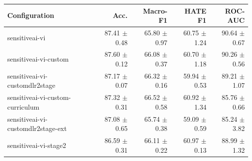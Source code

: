 \scriptsize
\setlength{\tabcolsep}{2pt}
\begin{tabular}{lrrrr}
\toprule
Configuration & Acc. & Macro-F1 & HATE F1 & ROC-AUC \\
\midrule
sensitiveai-vi & 87.41 $\pm$ 0.48 & 65.80 $\pm$ 0.97 & 60.75 $\pm$ 1.24 & 90.64 $\pm$ 0.67 \\
sensitiveai-vi-custom & 87.60 $\pm$ 0.12 & 66.08 $\pm$ 0.37 & 60.70 $\pm$ 1.18 & 90.26 $\pm$ 0.56 \\
sensitiveai-vi-customdlr2stage & 87.17 $\pm$ 0.07 & 66.32 $\pm$ 0.16 & 59.94 $\pm$ 0.53 & 89.21 $\pm$ 1.07 \\
sensitiveai-vi-custom-curriculum & 87.32 $\pm$ 0.31 & 66.52 $\pm$ 0.58 & 60.92 $\pm$ 1.34 & 85.76 $\pm$ 0.66 \\
sensitiveai-vi-customdlr2stage-ext & 87.08 $\pm$ 0.65 & 65.74 $\pm$ 0.38 & 59.09 $\pm$ 0.59 & 85.24 $\pm$ 3.82 \\
sensitiveai-vi-stage2 & 86.59 $\pm$ 0.31 & 66.11 $\pm$ 0.22 & 60.97 $\pm$ 0.13 & 88.99 $\pm$ 1.32 \\
\bottomrule
\end{tabular}
